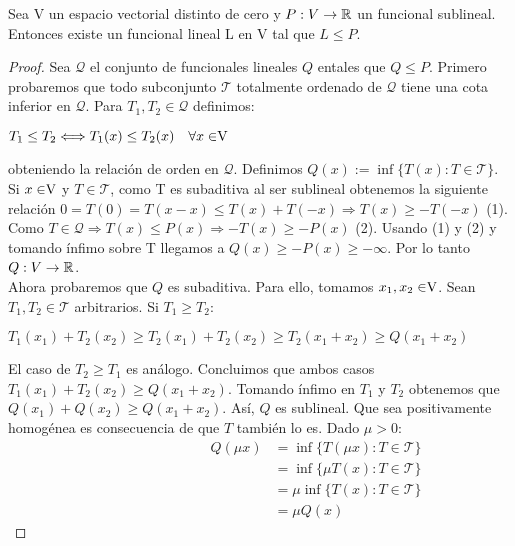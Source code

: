 	\begin{teoremaBox}
		Sea V un espacio vectorial distinto de cero y $P:V \rightarrow \mathbb{R}$ un funcional sublineal. Entonces existe un funcional lineal L en V tal que $ L \leq P $.
	\end{teoremaBox}
	\begin{proof}
		Sea $ \mathcal{Q} $ el conjunto de funcionales lineales $ Q $ en\vecSpace tales que $ Q \leq P $. Primero probaremos que todo subconjunto $ \mathcal{T} $ totalmente ordenado de $ \mathcal{Q} $ tiene una cota inferior en $ \mathcal{Q} $. Para $ T_1 ,T_2 \in \mathcal{Q} $ definimos:
		\begin{center}
			$ T_1 \leq T_2 \Longleftrightarrow T_1 (x) \leq T_2 (x) \quad \forall x \in \vecSpace $
		\end{center}
		
		obteniendo la relación de orden en  $ \mathcal{Q} $. Definimos $ Q(x):=\inf \{ T(x): T \in \mathcal{T} \} $. Si $ x \in \vecSpace $ y $ T \in \mathcal{T} $, como T es subaditiva al ser sublineal obtenemos la siguiente relación $ 0 = T(0) = T(x-x) \leq T(x) + T(-x) \Longrightarrow T(x) \geq -T(-x) $ (1). Como $ T \in \mathcal{Q} \Longrightarrow T(x) \leq P(x) \Longrightarrow -T(x) \geq -P(x)$ (2). Usando (1) y (2) y tomando ínfimo sobre T  llegamos a $ Q(x) \geq -P(x) \geq - \infty $. Por lo tanto $ Q:V \rightarrow \mathbb{R}$. \\
		
		Ahora probaremos que $ Q $ es subaditiva. Para ello, tomamos $ x_1, x_2\in \vecSpace $. Sean $ T_1 , T_2 \in \mathcal{T} $ arbitrarios. Si $ T_1 \geq T_2 $:
		
		\begin{center}
			$ T_1 (x_1)+  T_2 (x_2) \geq T_2(x_1)+  T_2 (x_2) \geq T_2(x_1 +x_2) \geq Q(x_1 + x_2)$
		\end{center}
		
		El caso de $ T_2 \geq T_1 $ es análogo. Concluimos que ambos casos $ T_1 (x_1)+  T_2 (x_2) \geq Q(x_1 + x_2)$. Tomando ínfimo en $ T_1 $ y $ T_2 $ obtenemos que $ Q (x_1)+  Q(x_2) \geq Q(x_1 + x_2)$. Así, $ Q $ es sublineal. Que sea positivamente homogénea es consecuencia de que $ T $ también lo es. Dado $ \mu > 0 $:
		\begin{equation*}
		\begin{split}
		\qquad \qquad \qquad \qquad 
		Q(\mu x) &=\inf \{ T(\mu x): T \in \mathcal{T} \} \\ 
		& = \inf \{ \mu T( x): T \in \mathcal{T} \} \\ 
		&= \mu\inf \{ T( x): T \in \mathcal{T} \} \\ 
		&= \mu Q(x) 
		\end{split}
		\end{equation*}
		

\end{proof}

